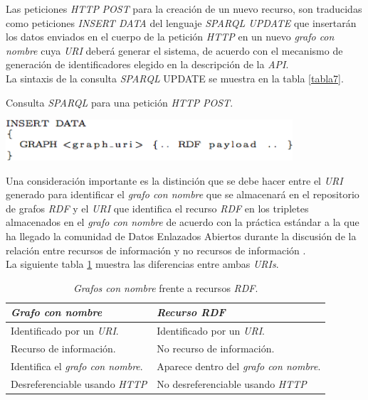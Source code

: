 Las  peticiones \textit{HTTP} \textit{POST} para la creaci\'on de un nuevo recurso, son traducidas como peticiones \textit{INSERT DATA} del lenguaje \textit{SPARQL UPDATE} que insertar\'an los datos enviados en el cuerpo de la petici\'on \textit{HTTP} en un nuevo \textit{grafo con nombre} cuya \textit{URI} deber\'a generar el sistema, de acuerdo con el mecanismo de generaci\'on de identificadores elegido en la descripci\'on de la \textit{API}.\\
La sintaxis de la consulta \textit{SPARQL} UPDATE se muestra en la tabla \ref{tabla7}.\\

\begin{table}
\vspace{2.4in}
\caption{Consulta \textit{SPARQL} para una petici\'on \textit{HTTP} \textit{POST}.}
\vspace{5mm}
\includegraphics[width=0.8\textwidth]{tabla7}
\label{tabla7}
\end{table}

Una consideraci\'on importante es la distinci\'on que se debe hacer entre el \textit{URI} generado para identificar el \textit{grafo con nombre} que se almacenar\'a en el repositorio de grafos \textit{RDF} y el \textit{URI} que identifica el recurso \textit{RDF} en los tripletes almacenados en el \textit{grafo con nombre} de acuerdo con la pr\'actica est\'andar a la que ha llegado la comunidad de Datos Enlazados Abiertos durante la discusi\'on de la relaci\'on entre recursos de informaci\'on y no recursos de informaci\'on \cite{fielding2005httprange}.\\
La siguiente tabla \ref{named_graph_vs_resource_uri} muestra las diferencias entre ambas \textit{URIs}.\\

\begin{table}
\centering
\caption{\textit{Grafos con nombre} frente a recursos \textit{RDF}.}
\vspace{5mm}
\label{named_graph_vs_resource_uri}
\begin{center}
\begin{tabular}{|l|l|}\hline
\textbf{\textit{Grafo con nombre}} & \textbf{\textit{Recurso RDF}} \\\hline
Identificado por un \textit{URI}. & Identificado por un \textit{URI}. \\
Recurso de informaci\'on. & No recurso de informaci\'on.\\
Identifica el \textit{grafo con nombre}. & Aparece dentro del \textit{grafo con nombre}.\\
Desreferenciable usando \textit{HTTP} & No desreferenciable usando \textit{HTTP}\\\hline
\end{tabular}
\end{center}
\end{table}


